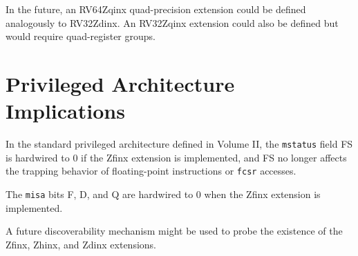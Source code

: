 \begin{commentary}
In the future, an RV64Zqinx quad-precision extension could be defined analogously
to RV32Zdinx.
An RV32Zqinx extension could also be defined but would require
quad-register groups.
\end{commentary}

\section{Privileged Architecture Implications}

In the standard privileged architecture defined in Volume II, the
{\tt mstatus} field FS is hardwired to 0 if the Zfinx extension is
implemented, and FS no longer affects the trapping behavior of
floating-point instructions or {\tt fcsr} accesses.

The {\tt misa} bits F, D, and Q are hardwired to 0 when the Zfinx
extension is implemented.

\begin{commentary}
A future discoverability mechanism might be used to probe the existence
of the Zfinx, Zhinx, and Zdinx extensions.
\end{commentary}
